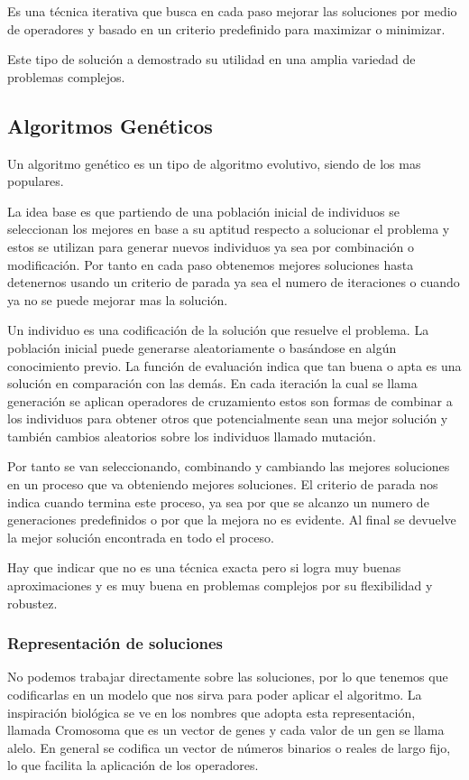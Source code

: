 Es una técnica iterativa que busca en cada paso mejorar las soluciones por medio de operadores y basado en un criterio predefinido para maximizar o minimizar.

Este tipo de solución a demostrado su utilidad en una amplia variedad de problemas complejos.


\subsection{Algoritmos Genéticos}
Un algoritmo genético es un tipo de algoritmo evolutivo, siendo de los mas populares.

La idea base es que partiendo de una población inicial de individuos se seleccionan los mejores en base a su aptitud respecto a solucionar el problema y estos se utilizan para generar nuevos individuos ya sea por combinación o modificación. Por tanto en cada paso obtenemos mejores soluciones hasta detenernos usando un criterio de parada ya sea el numero de iteraciones o cuando ya no se puede mejorar mas la solución.

Un individuo es una codificación de la solución que resuelve el problema.
La población inicial puede generarse aleatoriamente o basándose en algún conocimiento previo.
La función de evaluación indica que tan buena o apta es una solución en comparación con las demás.
En cada iteración la cual se llama generación se aplican operadores de cruzamiento estos son formas de combinar a los individuos para obtener otros que potencialmente sean una mejor solución y también cambios aleatorios sobre los individuos llamado mutación.

Por tanto se van seleccionando, combinando y cambiando las mejores soluciones en un proceso que va obteniendo mejores soluciones.
El criterio de parada nos indica cuando termina este proceso, ya sea por que se alcanzo un numero de generaciones predefinidos o por que la mejora no es evidente. Al final se devuelve la mejor solución encontrada en todo el proceso.

Hay que indicar que no es una técnica exacta pero si logra muy buenas aproximaciones y es muy buena en problemas complejos por su flexibilidad y robustez. 


\subsubsection{Representación de soluciones}
No podemos trabajar directamente sobre las soluciones, por lo que tenemos que codificarlas en un modelo que nos sirva para poder aplicar el algoritmo.
La inspiración biológica se ve en los nombres que adopta esta representación, llamada Cromosoma que es un vector de genes y cada valor de un gen se llama alelo.
En general se codifica un vector de números binarios o reales de largo fijo, lo que facilita la aplicación de los operadores.

